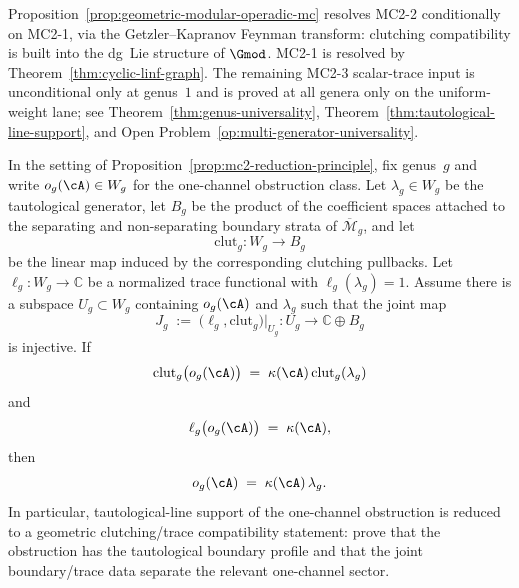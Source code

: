 \begin{remark}
\label{rem:mc2-2-resolution}
Proposition~\ref{prop:geometric-modular-operadic-mc} resolves
MC2-2 conditionally on MC2-1, via the Getzler--Kapranov Feynman
transform: clutching compatibility is built into the dg~Lie
structure of $\Gmod$.  MC2-1 is resolved by
Theorem~\ref{thm:cyclic-linf-graph}.  The remaining MC2-3
scalar-trace input is unconditional only at genus~$1$ and is
proved at all genera only on the uniform-weight lane; see
Theorem~\ref{thm:genus-universality},
Theorem~\ref{thm:tautological-line-support}, and
Open Problem~\ref{op:multi-generator-universality}.
\end{remark}

\begin{proposition}\label{prop:tautological-line-support-criterion}
In the setting of
Proposition~\textup{\ref{prop:mc2-reduction-principle}}, fix genus~$g$
and write $o_g(\cA)\in W_g$ for the one-channel obstruction class.
Let $\lambda_g\in W_g$ be the tautological generator, let
$B_g$ be the product of the coefficient spaces attached to the
separating and non-separating boundary strata of
$\overline{\mathcal{M}}_g$, and let
\[
\mathrm{clut}_g\colon W_g \longrightarrow B_g
\]
be the linear map induced by the corresponding clutching pullbacks.
Let $\ell_g\colon W_g\to\mathbb{C}$ be a normalized trace functional
with $\ell_g(\lambda_g)=1$.
Assume there is a subspace $U_g\subset W_g$ containing
$o_g(\cA)$ and $\lambda_g$ such that the joint map
\[
J_g
\;:=\;
\bigl(\ell_g,\mathrm{clut}_g\bigr)\big|_{U_g}
\colon U_g \longrightarrow \mathbb{C}\oplus B_g
\]
is injective.
If
\begin{equation}\label{eq:taut-line-support-clutching}
\mathrm{clut}_g\bigl(o_g(\cA)\bigr)
\;=\;
\kappa(\cA)\,\mathrm{clut}_g(\lambda_g)
\end{equation}
and
\begin{equation}\label{eq:taut-line-support-trace}
\ell_g\bigl(o_g(\cA)\bigr)
\;=\;
\kappa(\cA),
\end{equation}
then
\[
o_g(\cA) \;=\; \kappa(\cA)\,\lambda_g.
\]
In particular, tautological-line support of the one-channel
obstruction is reduced to a geometric clutching/trace compatibility
statement: prove that the obstruction has the tautological boundary
profile and that the joint boundary/trace data separate the relevant
one-channel sector.
\end{proposition}

